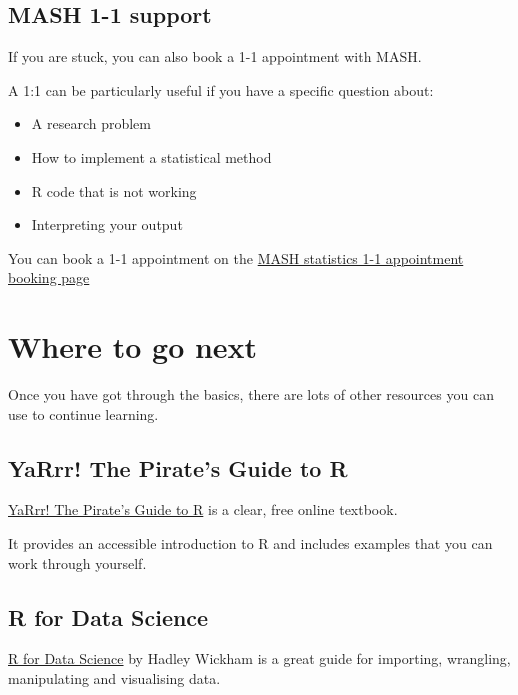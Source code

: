 \documentclass[
]{book}
\providecommand{\tightlist}{%
  \setlength{\itemsep}{0pt}\setlength{\parskip}{0pt}}
\begin{document}
\subsection{MASH 1-1 support}\label{mash-1-1-support}

If you are stuck, you can also book a 1-1 appointment with MASH.

A 1:1 can be particularly useful if you have a specific question about:

\begin{itemize}
\tightlist
\item
  A research problem
\item
  How to implement a statistical method
\item
  R code that is not working
\item
  Interpreting your output
\end{itemize}

You can book a 1-1 appointment on the \href{https://students.sheffield.ac.uk/mash/bookings/stats-support\#book-here}{MASH statistics 1-1 appointment booking page}

\section{Where to go next}\label{where-to-go-next}

Once you have got through the basics, there are lots of other resources you can use to continue learning.

\subsection{YaRrr! The Pirate's Guide to R}\label{yarrr-the-pirates-guide-to-r}

\href{https://bookdown.org/ndphillips/YaRrr/}{YaRrr! The Pirate's Guide to R} is a clear, free online textbook.

It provides an accessible introduction to R and includes examples that you can work through yourself.

\subsection{R for Data Science}\label{r-for-data-science}

\href{https://www.google.co.uk/books/edition/R_for_Data_Science/I6y3DQAAQBAJ?hl=en&gbpv=0}{R for Data Science} by Hadley Wickham is a great guide for importing, wrangling, manipulating and visualising data.
\end{document}
